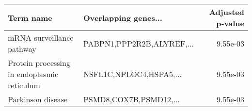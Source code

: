 \begin{tabular}{llr}
\toprule
                                  Term name &      Overlapping genes... &  Adjusted p-value \\
\midrule
                  mRNA surveillance pathway & PABPN1,PPP2R2B,ALYREF,... &          9.55e-03 \\
Protein processing in endoplasmic reticulum &   NSFL1C,NPLOC4,HSPA5,... &          9.55e-03 \\
                          Parkinson disease &    PSMD8,COX7B,PSMD12,... &          9.55e-03 \\
\bottomrule
\end{tabular}
